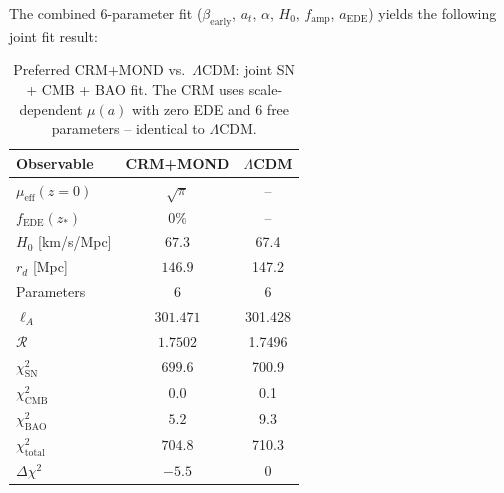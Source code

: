 \documentclass[aps,prd,twocolumn,superscriptaddress,nofootinbib,floatfix]{revtex4-2}
\begin{document}
The combined 6-parameter fit ($\beta_{\mathrm{early}}$, $a_t$, $\alpha$, $H_0$, $f_{\mathrm{amp}}$, $a_{\mathrm{EDE}}$) yields the following joint fit result:

\begin{table}[t]
\centering
\caption{Preferred CRM+MOND vs.\ $\Lambda$CDM: joint SN + CMB + BAO fit. The CRM uses scale-dependent $\mu(a)$ with zero EDE and 6 free parameters -- identical to $\Lambda$CDM.}
\label{tab:combined_fit}
\begin{tabular}{lcc}
\toprule
\textbf{Observable} & \textbf{CRM+MOND} & \textbf{$\Lambda$CDM} \\
\midrule
$\mu_{\mathrm{eff}}(z{=}0)$ & $\sqrt{\pi}$ & -- \\
$f_{\mathrm{EDE}}(z_*)$ & $0\%$ & -- \\
$H_0$ [km/s/Mpc] & $67.3$ & 67.4 \\
$r_d$ [Mpc] & $146.9$ & 147.2 \\
Parameters & $6$ & 6 \\
\midrule
$\ell_A$ & $301.471$ & 301.428 \\
$\mathcal{R}$ & $1.7502$ & 1.7496 \\
\midrule
$\chi^2_{\mathrm{SN}}$ & $699.6$ & 700.9 \\
$\chi^2_{\mathrm{CMB}}$ & $0.0$ & 0.1 \\
$\chi^2_{\mathrm{BAO}}$ & $5.2$ & 9.3 \\
\midrule
$\chi^2_{\mathrm{total}}$ & $704.8$ & 710.3 \\
$\Delta\chi^2$ & $-5.5$ & 0 \\
\bottomrule
\end{tabular}
\end{table}
\end{document}
